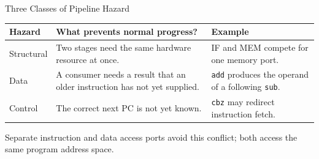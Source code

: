 \documentclass[aspectratio=169,11pt,t]{beamer}
\newcommand{\code}[1]{\texttt{#1}}
\begin{document}
\begin{frame}{Three Classes of Pipeline Hazard}
\begin{center}
\small
\renewcommand{\arraystretch}{1.28}
\setlength{\tabcolsep}{5pt}
\begin{tabular}{>{\raggedright\arraybackslash}p{2.2cm}>{\raggedright\arraybackslash}p{6.3cm}>{\raggedright\arraybackslash}p{4.2cm}}
\toprule
\rowcolor{white}
\textbf{Hazard} & \textbf{What prevents normal progress?} & \textbf{Example} \\
\midrule
Structural & Two stages need the same hardware resource at once. & IF and MEM compete for one memory port. \\
Data & A consumer needs a result that an older instruction has not yet supplied. & \code{add} produces the operand of a following \code{sub}. \\
Control & The correct next PC is not yet known. & \code{cbz} may redirect instruction fetch. \\
\bottomrule
\end{tabular}
\end{center}

\begin{center}
\end{center}
Separate instruction and data access ports avoid this conflict; both access the same program address space.

\end{frame}
\end{document}
